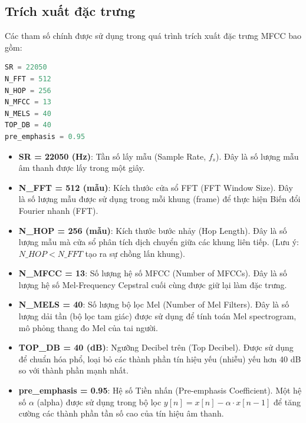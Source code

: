 \subsection{Trích xuất đặc trưng}
Các tham số chính được sử dụng trong quá trình trích xuất đặc trưng MFCC bao gồm:
\begin{tcolorbox}
\begin{lstlisting}[language=Python]
SR = 22050 
N_FFT = 512 
N_HOP = 256  
N_MFCC = 13
N_MELS = 40
TOP_DB = 40
pre_emphasis = 0.95
\end{lstlisting}
\end{tcolorbox}
\begin{itemize} 
  \item \textbf{SR = 22050 (Hz)}: Tần số lấy mẫu (Sample Rate, $f_s$). Đây là số lượng mẫu âm thanh được lấy trong một giây. 
  \item \textbf{N\_FFT = 512 (mẫu)}: Kích thước cửa sổ FFT (FFT Window Size). Đây là số lượng mẫu được sử dụng trong mỗi khung (frame) để thực hiện Biến đổi Fourier nhanh (FFT). 
  \item \textbf{N\_HOP = 256 (mẫu)}: Kích thước bước nhảy (Hop Length). Đây là số lượng mẫu mà cửa sổ phân tích dịch chuyển giữa các khung liên tiếp. (Lưu ý: $N\_HOP < N\_FFT$ tạo ra sự chồng lấn khung). 
  \item \textbf{N\_MFCC = 13}: Số lượng hệ số MFCC (Number of MFCCs). Đây là số lượng hệ số Mel-Frequency Cepstral cuối cùng được giữ lại làm đặc trưng. 
  \item \textbf{N\_MELS = 40}: Số lượng bộ lọc Mel (Number of Mel Filters). Đây là số lượng dải tần (bộ lọc tam giác) được sử dụng để tính toán Mel spectrogram, mô phỏng thang đo Mel của tai người. 
  \item \textbf{TOP\_DB = 40 (dB)}: Ngưỡng Decibel trên (Top Decibel). Được sử dụng để chuẩn hóa phổ, loại bỏ các thành phần tín hiệu yếu (nhiễu) yếu hơn 40 dB so với thành phần mạnh nhất. 
  \item \textbf{pre\_emphasis = 0.95}: Hệ số Tiền nhấn (Pre-emphasis Coefficient). Một hệ số $\alpha$ (alpha) được sử dụng trong bộ lọc $y[n] = x[n] - \alpha \cdot x[n-1]$ để tăng cường các thành phần tần số cao của tín hiệu âm thanh. 
\end{itemize}

